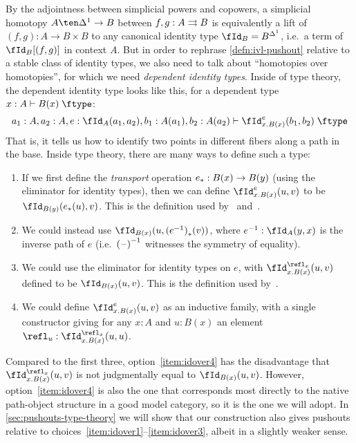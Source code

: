\documentclass{amsart}
\let\Id\fId
\let\type\fibtype
\renewcommand{\idover}[4][]{\fId_{#1}^{#4}(#2,#3)}
\begin{document}
By the adjointness between simplicial powers and copowers, a simplicial homotopy $A\ten\ivl \to B$ between $f,g:A\rightrightarrows B$ is equivalently a lift of $(f,g):A\to B\times B$ to any canonical identity type $\Id_B = B^\ivl$, i.e.\ a term of $\Id_B[(f,g)]$ in context $A$.
But in order to rephrase \cref{defn:ivl-pushout} relative to a stable class of identity types, we also need to talk about ``homotopies over homotopies'', for which we need \emph{dependent identity types}.
Inside of type theory, the dependent identity type looks like this, for a dependent type $x:A \types B(x)\type$:
\[ a_1:A, a_2:A, e:\id[A]{a_1}{a_2}, b_1:A(a_1), b_2:A(a_2) \types \idover[x.B(x)]{b_1}{b_2}{e} \type \]
That is, it tells us how to identify two points in different fibers along a path in the base.
Inside type theory, there are many ways to define such a type:
\begin{enumerate}\label{idover}
\item If we first define the \emph{transport} operation ${e}_{*}:B(x) \to B(y)$ (using the eliminator for identity types), then we can define $\idover[x.B(x)]{u}{v}{e}$ to be $\id[B(y)]{\transf{e}(u)}{v}$.
  This is the definition used by~\cite{hottbook} and~\cite{hottcoq,bglsss:hottcoq}.\label{item:idover1}
\item We could instead use $\id[B(x)]{u}{\transf{(\opp{e})}(v)}$, where $\opp{e}:\id[A]{y}{x}$ is the inverse path of $e$ (i.e.\ $\mathord{{(\mathord{\hspace{1pt}\text{--}\hspace{1pt}})}^{-1}}$ witnesses the symmetry of equality).\label{item:idover2}
\item We could use the eliminator for identity types on $e$, with $\idover[x.B(x)]{u}{v}{\refl_x}$ defined to be $\id[B(x)]{u}{v}$.
  This is the definition used by~\cite{hottagda}.\label{item:idover3}
\item We could define $\idover[x.B(x)]{u}{v}{e}$ as an inductive family, with a single constructor giving for any $x:A$ and $u:B(x)$ an element $\refl_u : \idover[x.B(x)]{u}{u}{\refl_x}$.\label{item:idover4}
\end{enumerate}
Compared to the first three, option~\ref{item:idover4} has the disadvantage that $\idover[x.B(x)]{u}{v}{\refl_x}$ is not judgmentally equal to $\id[B(x)]{u}{v}$.
However, option~\ref{item:idover4} is also the one that corresponds most directly to the native path-object structure in a good model category, so it is the one we will adopt.
In \cref{sec:pushouts-type-theory} we will show that our construction also gives pushouts relative to choices~\ref{item:idover1}--\ref{item:idover3}, albeit in a slightly weaker sense.
\end{document}

